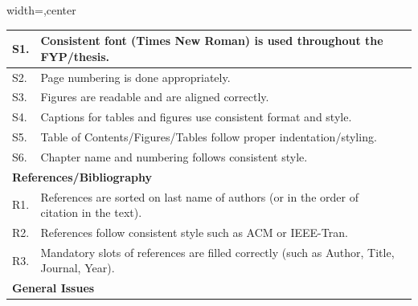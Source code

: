 \begin{table}[!ht]
\begin{adjustbox}{width=\linewidth,center}
\begin{tabular}{p{0.6cm}p{9cm}p{0.6cm}}
\multicolumn{1}{|l|}{S1.} & \multicolumn{1}{l|}{Consistent font (Times New Roman) is   used throughout the FYP/thesis.}                                              & \multicolumn{1}{l|}{} \\ \midrule
\multicolumn{1}{|l|}{S2.} & \multicolumn{1}{l|}{Page numbering is   done appropriately.}                                                                         & \multicolumn{1}{l|}{} \\ \midrule
\multicolumn{1}{|l|}{S3.} & \multicolumn{1}{l|}{Figures are readable   and are aligned correctly.}                                                               & \multicolumn{1}{l|}{} \\ \midrule
\multicolumn{1}{|l|}{S4.} & \multicolumn{1}{l|}{Captions for tables   and figures use consistent format and style.}                                              & \multicolumn{1}{l|}{} \\ \midrule
\multicolumn{1}{|l|}{S5.} & \multicolumn{1}{l|}{Table of   Contents/Figures/Tables follow proper indentation/styling.}                                           & \multicolumn{1}{l|}{} \\ \midrule
\multicolumn{1}{|l|}{S6.} & \multicolumn{1}{l|}{Chapter name and   numbering follows consistent style.}                                                          & \multicolumn{1}{l|}{} \\ \midrule
\multicolumn{3}{|l|}{\textbf{References/Bibliography}}                                                                                                                                   \\ \midrule
\multicolumn{1}{|l|}{R1.} & \multicolumn{1}{l|}{References are   sorted on last name of authors (or in the order of citation in the text).}                      & \multicolumn{1}{l|}{} \\ \midrule
\multicolumn{1}{|l|}{R2.} & \multicolumn{1}{l|}{References follow   consistent style such as ACM or IEEE-Tran.}                                                  & \multicolumn{1}{l|}{} \\ \midrule
\multicolumn{1}{|l|}{R3.} & \multicolumn{1}{l|}{Mandatory slots of   references are filled correctly (such as Author, Title, Journal, Year).}                    & \multicolumn{1}{l|}{} \\ \midrule
\multicolumn{3}{|l|}{\textbf{General Issues}}                                                                                                                                            \\ \midrule

\end{tabular}
\end{adjustbox}
\end{table}
